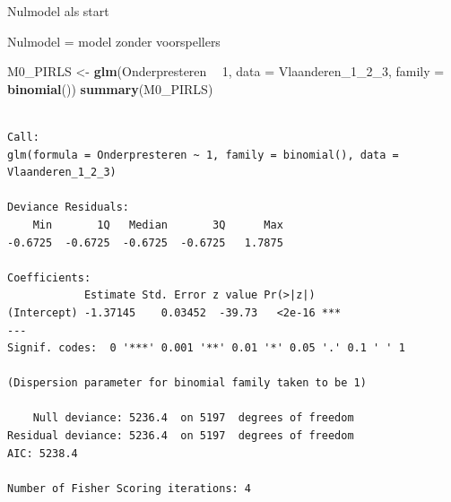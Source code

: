 \documentclass[
  10pt,
  ignorenonframetext,
]{beamer}
\newenvironment{Shaded}{\begin{snugshade}}{\end{snugshade}}
\newcommand{\DataTypeTok}[1]{\textcolor[rgb]{0.13,0.29,0.53}{#1}}
\newcommand{\DecValTok}[1]{\textcolor[rgb]{0.00,0.00,0.81}{#1}}
\newcommand{\KeywordTok}[1]{\textcolor[rgb]{0.13,0.29,0.53}{\textbf{#1}}}
\newcommand{\NormalTok}[1]{#1}
\newcommand{\OperatorTok}[1]{\textcolor[rgb]{0.81,0.36,0.00}{\textbf{#1}}}
\newcommand{\StringTok}[1]{\textcolor[rgb]{0.31,0.60,0.02}{#1}}
\begin{document}
\begin{frame}[fragile]{Nulmodel als start}
\protect\hypertarget{nulmodel-als-start}{}

Nulmodel = model zonder voorspellers

\tiny

\begin{Shaded}
\begin{Highlighting}[]
\NormalTok{M0_PIRLS <-}\StringTok{ }\KeywordTok{glm}\NormalTok{(Onderpresteren }\OperatorTok{~}\StringTok{ }\DecValTok{1}\NormalTok{, }
                \DataTypeTok{data =}\NormalTok{ Vlaanderen_}\DecValTok{1}\NormalTok{_}\DecValTok{2}\NormalTok{_}\DecValTok{3}\NormalTok{, }\DataTypeTok{family =} \KeywordTok{binomial}\NormalTok{())}
\KeywordTok{summary}\NormalTok{(M0_PIRLS)}
\end{Highlighting}
\end{Shaded}

\begin{verbatim}

Call:
glm(formula = Onderpresteren ~ 1, family = binomial(), data = Vlaanderen_1_2_3)

Deviance Residuals: 
    Min       1Q   Median       3Q      Max  
-0.6725  -0.6725  -0.6725  -0.6725   1.7875  

Coefficients:
            Estimate Std. Error z value Pr(>|z|)    
(Intercept) -1.37145    0.03452  -39.73   <2e-16 ***
---
Signif. codes:  0 '***' 0.001 '**' 0.01 '*' 0.05 '.' 0.1 ' ' 1

(Dispersion parameter for binomial family taken to be 1)

    Null deviance: 5236.4  on 5197  degrees of freedom
Residual deviance: 5236.4  on 5197  degrees of freedom
AIC: 5238.4

Number of Fisher Scoring iterations: 4
\end{verbatim}

\normalsize

\end{frame}
\end{document}
